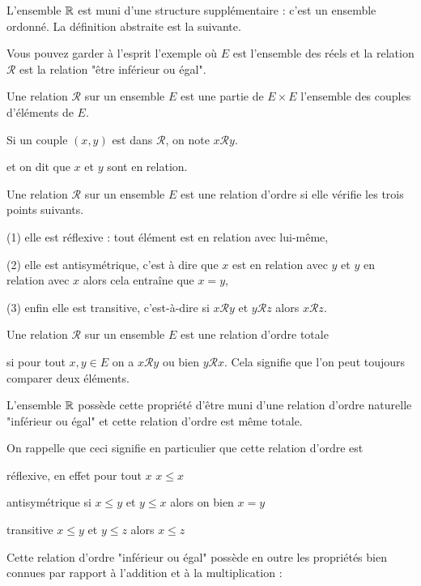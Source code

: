 L'ensemble $\mathbb{R}$ est muni d'une structure supplémentaire : 
c'est un ensemble ordonné. La définition abstraite est la suivante.

Vous pouvez garder à l'esprit l'exemple où $E$ est l'ensemble des réels 
et la relation $\mathcal{R}$ est la relation "être inférieur ou égal".

Une relation $\mathcal R$ sur un ensemble $E$ est une partie de 
$E\times E$ l'ensemble des couples d'éléments de $E$.

\change

 Si un couple $(x,y)$ est dans $\mathcal R$, on note $x\mathcal R y$.
 
 et on dit que $x$ et $y$ sont en relation.

\change

Une relation $\mathcal R$ sur un ensemble $E$ est une relation d'ordre si 
elle vérifie les trois points suivants.

(1) elle est réflexive : tout élément est en relation avec lui-même, 

(2) elle est antisymétrique, c'est à dire que $x$ est en relation avec $y$  et $y$ en relation avec $x$ alors cela 
entraîne que $x=y$,

(3) enfin elle est transitive, 
c'est-à-dire si $x\mathcal R y$ et $y\mathcal R z$ alors $x\mathcal R z$.

\change


Une relation $\mathcal R$ sur un ensemble $E$ est une relation d'ordre totale 

si pour tout $x,y\in E$ on a $ x\mathcal R y$ ou bien $y\mathcal R x$.
Cela signifie que l'on peut toujours comparer deux éléments.



\diapo

L'ensemble $\mathbb{R}$ possède cette propriété d'être muni 
d'une relation d'ordre naturelle "inférieur ou égal" et cette relation d'ordre est même totale.

\change

On rappelle que ceci signifie en particulier que cette relation d'ordre est 

réflexive, en effet pour tout $x$ $x \le x$

antisymétrique   si $x \le y$ et $y\le x$ alors on bien $x=y$

transitive $x\le y$ et $y\le z$ alors $x\le z$

\change

Cette relation d'ordre "inférieur ou égal" possède en outre les propriétés bien connues 
par rapport à l'addition et à la multiplication : 

